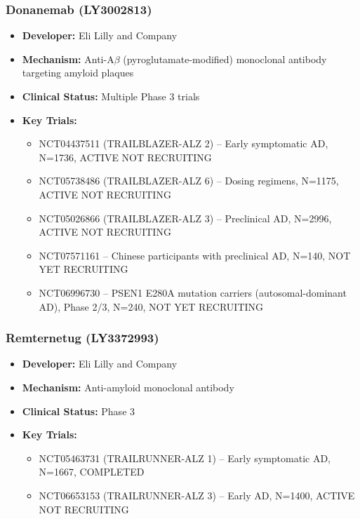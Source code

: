 \documentclass[11pt, a4paper]{article}
\begin{document}
\subsubsection{Donanemab (LY3002813)}
\begin{itemize}
    \item \textbf{Developer:} Eli Lilly and Company
    \item \textbf{Mechanism:} Anti-A$\beta$ (pyroglutamate-modified) monoclonal antibody targeting amyloid plaques
    \item \textbf{Clinical Status:} Multiple Phase 3 trials
    \item \textbf{Key Trials:}
    \begin{itemize}
        \item NCT04437511 (TRAILBLAZER-ALZ 2) -- Early symptomatic AD, N=1736, ACTIVE NOT RECRUITING
        \item NCT05738486 (TRAILBLAZER-ALZ 6) -- Dosing regimens, N=1175, ACTIVE NOT RECRUITING
        \item NCT05026866 (TRAILBLAZER-ALZ 3) -- Preclinical AD, N=2996, ACTIVE NOT RECRUITING
        \item NCT07571161 -- Chinese participants with preclinical AD, N=140, NOT YET RECRUITING
        \item NCT06996730 -- PSEN1 E280A mutation carriers (autosomal-dominant AD), Phase 2/3, N=240, NOT YET RECRUITING
    \end{itemize}
\end{itemize}

\subsubsection{Remternetug (LY3372993)}
\begin{itemize}
    \item \textbf{Developer:} Eli Lilly and Company
    \item \textbf{Mechanism:} Anti-amyloid monoclonal antibody
    \item \textbf{Clinical Status:} Phase 3
    \item \textbf{Key Trials:}
    \begin{itemize}
        \item NCT05463731 (TRAILRUNNER-ALZ 1) -- Early symptomatic AD, N=1667, COMPLETED
        \item NCT06653153 (TRAILRUNNER-ALZ 3) -- Early AD, N=1400, ACTIVE NOT RECRUITING
    \end{itemize}
\end{itemize}
\end{document}
